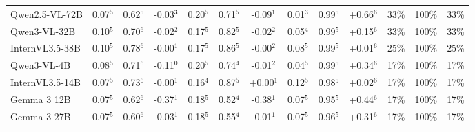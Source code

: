\begin{table}[pos=t]
{\begin{tabular}{l@{\hspace{7pt}}ccc@{\hspace{4pt}}ccc@{\hspace{4pt}}ccc@{\hspace{4pt}}ccc}
Qwen2.5-VL-72B & \cellcolor{cfSage2}0.07$^{5}$ & \cellcolor{cfSage2}0.62$^{5}$ & \cellcolor{cfSlate2}-0.03$^{3}$ & \cellcolor{cfSage3}0.20$^{5}$ & \cellcolor{cfSage2}0.71$^{5}$ & \cellcolor{cfSlate2}-0.09$^{1}$ & \cellcolor{cfSage1}0.01$^{3}$ & \cellcolor{cfSage4}0.99$^{5}$ & \cellcolor{cfTerra4}+0.66$^{6}$ & \cellcolor{cfTerra3}33\% & \cellcolor{cfTerra4}100\% & 33\% \\
Qwen3-VL-32B & \cellcolor{cfSage2}0.10$^{5}$ & \cellcolor{cfSage2}0.70$^{6}$ & \cellcolor{cfSlate2}-0.02$^{2}$ & \cellcolor{cfSage3}0.17$^{5}$ & \cellcolor{cfSage3}0.82$^{5}$ & \cellcolor{cfSlate2}-0.02$^{2}$ & \cellcolor{cfSage2}0.05$^{4}$ & \cellcolor{cfSage4}0.99$^{5}$ & \cellcolor{cfTerra3}+0.15$^{6}$ & \cellcolor{cfTerra3}33\% & \cellcolor{cfTerra4}100\% & 33\% \\
InternVL3.5-38B & \cellcolor{cfSage2}0.10$^{5}$ & \cellcolor{cfSage3}0.78$^{6}$ & \cellcolor{cfSlate1}-0.00$^{1}$ & \cellcolor{cfSage3}0.17$^{5}$ & \cellcolor{cfSage3}0.86$^{5}$ & \cellcolor{cfSlate1}-0.00$^{2}$ & \cellcolor{cfSage2}0.08$^{5}$ & \cellcolor{cfSage4}0.99$^{5}$ & \cellcolor{cfTerra1}+0.01$^{6}$ & \cellcolor{cfTerra3}25\% & \cellcolor{cfTerra4}100\% & 25\% \\
Qwen3-VL-4B & \cellcolor{cfSage2}0.08$^{5}$ & \cellcolor{cfSage2}0.71$^{6}$ & \cellcolor{cfSlate3}-0.11$^{0}$ & \cellcolor{cfSage4}0.20$^{5}$ & \cellcolor{cfSage2}0.74$^{4}$ & \cellcolor{cfSlate1}-0.01$^{2}$ & \cellcolor{cfSage1}0.04$^{5}$ & \cellcolor{cfSage4}0.99$^{5}$ & \cellcolor{cfTerra4}+0.34$^{6}$ & \cellcolor{cfTerra3}17\% & \cellcolor{cfTerra4}100\% & 17\% \\
InternVL3.5-14B & \cellcolor{cfSage2}0.07$^{5}$ & \cellcolor{cfSage2}0.73$^{6}$ & \cellcolor{cfSlate1}-0.00$^{1}$ & \cellcolor{cfSage3}0.16$^{4}$ & \cellcolor{cfSage3}0.87$^{5}$ & \cellcolor{cfTerra1}+0.00$^{1}$ & \cellcolor{cfSage3}0.12$^{5}$ & \cellcolor{cfSage4}0.98$^{5}$ & \cellcolor{cfTerra1}+0.02$^{6}$ & \cellcolor{cfTerra3}17\% & \cellcolor{cfTerra4}100\% & 17\% \\
Gemma 3 12B & \cellcolor{cfSage2}0.07$^{5}$ & \cellcolor{cfSage2}0.62$^{6}$ & \cellcolor{cfSlate4}-0.37$^{1}$ & \cellcolor{cfSage3}0.18$^{5}$ & \cellcolor{cfSage1}0.52$^{4}$ & \cellcolor{cfSlate4}-0.38$^{1}$ & \cellcolor{cfSage2}0.07$^{5}$ & \cellcolor{cfSage4}0.95$^{5}$ & \cellcolor{cfTerra4}+0.44$^{6}$ & \cellcolor{cfTerra3}17\% & \cellcolor{cfTerra4}100\% & 17\% \\
Gemma 3 27B & \cellcolor{cfSage2}0.07$^{5}$ & \cellcolor{cfSage2}0.60$^{6}$ & \cellcolor{cfSlate2}-0.03$^{1}$ & \cellcolor{cfSage3}0.18$^{5}$ & \cellcolor{cfSage1}0.55$^{4}$ & \cellcolor{cfSlate1}-0.01$^{1}$ & \cellcolor{cfSage2}0.07$^{5}$ & \cellcolor{cfSage4}0.96$^{5}$ & \cellcolor{cfTerra4}+0.31$^{6}$ & \cellcolor{cfTerra3}17\% & \cellcolor{cfTerra4}100\% & 17\% \\

\end{tabular}}
\end{table}
